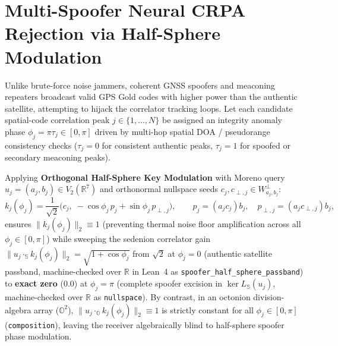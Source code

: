\documentclass[11pt,a4paper]{article}
\theoremstyle{definition}
\theoremstyle{remark}
\newcommand{\R}{\mathbb{R}}
\newcommand{\Oc}{\mathbb{O}}
\newcommand{\Se}{\mathbb{S}}
\begin{document}
\section{Multi-Spoofer Neural CRPA Rejection via Half-Sphere Modulation}
\label{sec:spoofer}

Unlike brute-force noise jammers, coherent GNSS spoofers and meaconing repeaters broadcast valid GPS Gold codes with higher power than the authentic satellite, attempting to hijack the correlator tracking loops. Let each candidate spatial-code correlation peak $j \in \{1, \dots, N\}$ be assigned an integrity anomaly phase $\phi_j = \pi \tau_j \in [0, \pi]$ driven by multi-hop spatial DOA / pseudorange consistency checks ($\tau_j = 0$ for consistent authentic peaks, $\tau_j = 1$ for spoofed or secondary meaconing peaks).

Applying \textbf{Orthogonal Half-Sphere Key Modulation} \cite{Agourakis2026PG32} with Moreno query $u_j = (a_j, b_j) \in V_2(\R^7)$ and orthonormal nullspace seeds $c_j, c_{\perp, j} \in W_{a_j, b_j}^\perp$:
\begin{equation}
\label{eq:crpa_half_sphere}
k_j(\phi_j) = \frac{1}{\sqrt{2}}\Big(c_j, \; -\cos\phi_j \, p_j + \sin\phi_j \, p_{\perp, j}\Big), \qquad p_j = (a_j c_j) b_j, \quad p_{\perp, j} = (a_j c_{\perp, j}) b_j,
\end{equation}
ensures $\|k_j(\phi_j)\|_2 \equiv 1$ (preventing thermal noise floor amplification across all $\phi_j \in [0, \pi]$) while sweeping the sedenion correlator gain $\|u_j \cdot_{\Se} k_j(\phi_j)\|_2 = \sqrt{1 + \cos\phi_j}$ from $\sqrt{2}$ at $\phi_j = 0$ (authentic satellite passband, machine-checked over $\R$ in Lean~4 as \texttt{spoofer\_half\_sphere\_passband}) to \textbf{exact zero} ($0.0$) at $\phi_j = \pi$ (complete spoofer excision in $\ker L_{\Se}(u_j)$, machine-checked over $\R$ as \texttt{nullspace}). By contrast, in an octonion division-algebra array ($\Oc^2$), $\|u_j \cdot_{\Oc} k_j(\phi_j)\|_2 \equiv 1$ is strictly constant for all $\phi_j \in [0, \pi]$ (\texttt{composition}), leaving the receiver algebraically blind to half-sphere spoofer phase modulation.
\end{document}
